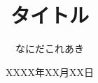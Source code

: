 \documentclass{beamer}
\title{タイトル}
\institute{XXXXXX研究室}
\author{なにだこれあき}
\date{XXXX年XX月XX日}
\begin{document}
\begin{frame}[t]
    \begin{columns}[t]
        \begin{column}{0.5\textwidth}
            
        \end{column}
        \begin{column}{0.5\textwidth}
            
        \end{column}
    \end{columns}
    \begin{columns}[t]
        \begin{column}{0.5\textwidth}
            
        \end{column}
        \begin{column}{0.5\textwidth}
            
        \end{column}
    \end{columns}
    \begin{columns}[t]
        \begin{column}{0.5\textwidth}
            
        \end{column}
        \begin{column}{0.5\textwidth}
            
        \end{column}
    \end{columns}
\end{frame}
\end{document}
